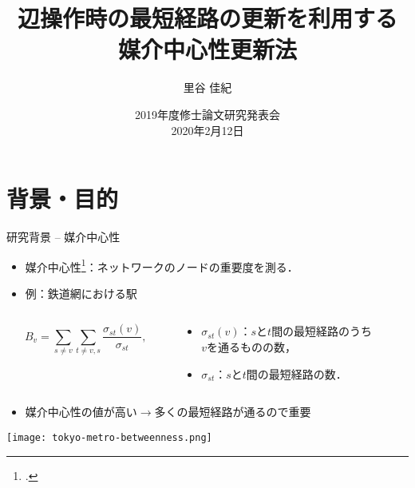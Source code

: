 \documentclass[dvipdfmx,fleqn]{beamer}
\title[媒介中心性更新法]{辺操作時の最短経路の更新を利用する \\ 媒介中心性更新法}
\author[里谷]{里谷 佳紀}
\institute[情数工研]{情報数理工学研究室}
\date[研究発表会]{2019年度修士論文研究発表会 \\ 2020年2月12日}
\begin{document}
\makeIMELABtitle


\section{背景・目的}
\begin{frame}[t]{研究背景 -- 媒介中心性}
  \begin{itemize}
  \item \alert{媒介中心性}\footcite{05Freeman1977}：ネットワークのノードの重要度を測る．
  \item[] 例：鉄道網における駅
  \end{itemize}
  \begin{columns}
    \begin{column}{.4\textwidth}
      \begin{equation*}
        B_v=\sum_{s\neq v}\sum_{t\neq v,s}\frac{\sigma_{st}(v)}{\sigma_{st}},
      \end{equation*}
    \end{column}
    \begin{column}{.6\textwidth}
      \begin{itemize}
      \item $\sigma_{st}(v)$：$s$と$t$間の最短経路のうち\\$v$を通るものの数，
      \item $\sigma_{st}$：$s$と$t$間の最短経路の数．
      \end{itemize}
    \end{column}
  \end{columns}
  \medskip
  \begin{itemize}
  \item 媒介中心性の値が高い$\rightarrow$\alert{多くの最短経路が通る}ので重要
  \end{itemize}
  \vspace{-.5em}
  \begin{center}
    \texttt{[image: tokyo-metro-betweenness.png]}
  \end{center}
\end{frame}
\end{document}
